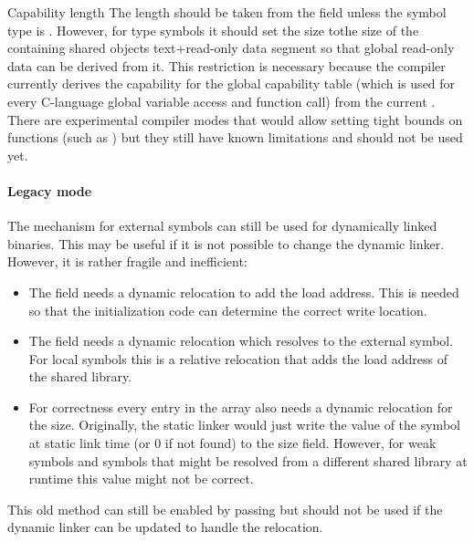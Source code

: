 \begin{notebox}{Capability length }
	The length should be taken from the   field unless the symbol type is .
	However, for  type symbols it should set the size tothe size of the containing shared objects
	text+read-only data segment so that global read-only data can be derived from it.
	This restriction is necessary because the compiler currently derives the capability for the global capability table
	(which is used for every C-language global variable access and function call) from the current .
	There are experimental compiler modes that would allow setting tight bounds on functions (such as )
	but they still have known limitations and should not be used yet.
\end{notebox}

\paragraph{Legacy mode}
The  mechanism for external symbols can still be used for dynamically linked binaries. This may be useful if it is not possible to change the dynamic linker. However, it is rather fragile and inefficient:
\begin{itemize}
	\item The  field needs a dynamic relocation to add the load address. This is needed so that the initialization code can determine the correct write location.
	\item The  field needs a dynamic relocation which resolves to the external symbol. For local symbols this is a relative relocation that adds the load address of the shared library.
	\item For correctness every entry in the array also needs a  dynamic relocation for the size. Originally, the static linker would just write the  value of the symbol at static link time (or 0 if not found) to the size field. However, for weak symbols and symbols that might be resolved from a different shared library at runtime this value might not be correct.
\end{itemize}

This old method can still be enabled by passing  but should not be used if the dynamic linker can be updated to handle the  relocation.


